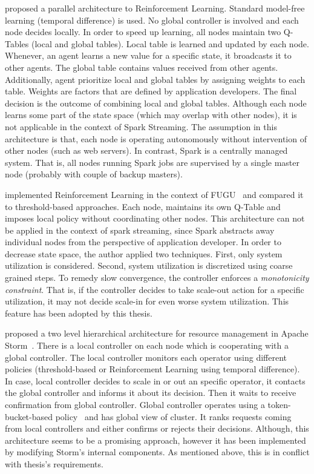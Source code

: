 \textcite{Enda:2012} proposed a parallel architecture to Reinforcement Learning. Standard model-free learning (temporal difference) is used. No global controller is involved and each node decides locally. In order to speed up learning, all nodes maintain two Q-Tables (local and global tables). Local table is learned and updated by each node. Whenever, an agent learns a new value for a specific state, it broadcasts it to other agents. The global table contains values received from other agents. Additionally, agent prioritize local and global tables by assigning weights to each table. Weights are factors that are defined by application developers. The final decision is the outcome of combining local and global tables. Although each node learns some part of the state space (which may overlap with other nodes), it is not applicable in the context of Spark Streaming. The assumption in this architecture is that, each node is operating autonomously without intervention of other nodes (such as web servers). In contrast, Spark is a centrally managed system. That is, all nodes running Spark jobs are supervised by a single master node (probably with couple of backup masters).

\textcite{Heinze:2014} implemented Reinforcement Learning in the context of FUGU~\cite{Grandl:2014:MPC} and compared it to threshold-based approaches. Each node, maintains its own Q-Table and imposes local policy without coordinating other nodes. This architecture can not be applied in the context of spark streaming, since Spark abstracts away individual nodes from the perspective of application developer. In order to decrease state space, the author applied two techniques. First, only system utilization is considered. Second, system utilization is discretized using coarse grained steps. To remedy slow convergence, the controller enforces a \emph{monotonicity constraint}\cite{Herodotou:2011}. That is, if the controller decides to take scale-out action for a specific utilization, it may not decide scale-in for even worse system utilization. This feature has been adopted by this thesis.  

\textcite{CARDELLINI2018171} proposed a two level hierarchical architecture for resource management in Apache Storm~\cite{Storm}. There is a local controller on each node which is cooperating with a global controller. The local controller monitors each operator using different policies (threshold-based or Reinforcement Learning using temporal difference). In case, local controller decides to scale in or out an specific operator, it contacts the global controller and informs it about its decision. Then it waits to receive confirmation from global controller. Global controller operates using a token-bucket-based policy~\cite{Valeria:2018} and has global view of cluster. It ranks requests coming from local controllers and either confirms or rejects their decisions. Although, this architecture seems to be a promising approach, however it has been implemented by modifying Storm's internal components. As mentioned above, this is in conflict with thesis's requirements.

